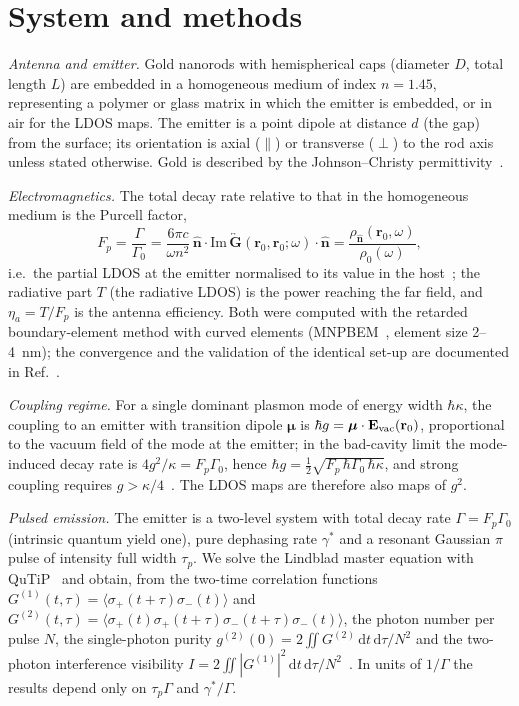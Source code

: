 \documentclass[11pt,a4paper]{article}
\newcommand{\Fp}{F_p}
\begin{document}
\section{System and methods}
\emph{Antenna and emitter.} Gold nanorods with hemispherical caps (diameter $D$, total length $L$) are embedded in a
homogeneous medium of index $n=1.45$, representing a polymer or glass matrix in which the emitter is embedded, or in air
for the LDOS maps. The emitter is a point dipole at distance $d$ (the gap) from the surface; its orientation is axial
($\parallel$) or transverse ($\perp$) to the rod axis unless stated otherwise. Gold is described by the
Johnson--Christy permittivity~\cite{johnson}.

\emph{Electromagnetics.} The total decay rate relative to that in the homogeneous medium is the Purcell factor,
\begin{equation}
  \Fp=\frac{\Gamma}{\Gamma_0}=\frac{6\pi c}{\omega n^2}\,\hat{\mathbf n}\cdot\mathrm{Im}\,
  \overleftrightarrow{\mathbf G}(\mathbf r_0,\mathbf r_0;\omega)\cdot\hat{\mathbf n}=\frac{\rho_{\hat{\mathbf n}}(\mathbf r_0,\omega)}{\rho_0(\omega)},
\end{equation}
i.e.\ the partial LDOS at the emitter normalised to its value in the host~\cite{novotny}; the radiative part $T$
(the radiative LDOS) is the power reaching the far field, and $\eta_a=T/\Fp$ is the antenna efficiency. Both were
computed with the retarded boundary-element method with curved elements (MNPBEM~\cite{hohenester2012}, element size
2--\SI{4}{nm}); the convergence and the validation of the identical set-up are documented in Ref.~\cite{paper1}.

\emph{Coupling regime.} For a single dominant plasmon mode of energy width $\hbar\kappa$, the coupling to an emitter
with transition dipole $\boldsymbol\mu$ is $\hbar g=\boldsymbol\mu\cdot\mathbf E_{\rm vac}(\mathbf r_0)$, proportional
to the vacuum field of the mode at the emitter; in the bad-cavity limit the mode-induced decay rate is
$4g^2/\kappa=\Fp\Gamma_0$, hence $\hbar g=\tfrac12\sqrt{\Fp\,\hbar\Gamma_0\,\hbar\kappa}$, and strong coupling requires
$g>\kappa/4$~\cite{torma2015}. The LDOS maps are therefore also maps of $g^2$.

\emph{Pulsed emission.} The emitter is a two-level system with total decay rate $\Gamma=\Fp\Gamma_0$ (intrinsic quantum
yield one), pure dephasing rate $\gamma^*$ and a resonant Gaussian $\pi$ pulse of intensity full width $\tau_p$. We
solve the Lindblad master equation with QuTiP~\cite{qutip5} and obtain, from the two-time correlation functions
$G^{(1)}(t,\tau)=\langle\sigma_+(t+\tau)\sigma_-(t)\rangle$ and
$G^{(2)}(t,\tau)=\langle\sigma_+(t)\sigma_+(t+\tau)\sigma_-(t+\tau)\sigma_-(t)\rangle$, the photon number per pulse
$N$, the single-photon purity $g^{(2)}(0)=2\iint G^{(2)}\,\mathrm dt\,\mathrm d\tau/N^2$ and the two-photon
interference visibility $I=2\iint|G^{(1)}|^2\,\mathrm dt\,\mathrm d\tau/N^2$~\cite{fischer2016}. In units of
$1/\Gamma$ the results depend only on $\tau_p\Gamma$ and $\gamma^*/\Gamma$.
\end{document}
